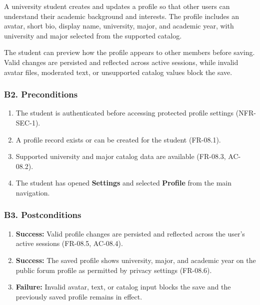 \documentclass[12pt]{article}
\begin{document}
A university student creates and updates a profile so that other users can understand their academic background and interests. The profile includes an avatar, short bio, display name, university, major, and academic year, with university and major selected from the supported catalog.
\par\medskip

The student can preview how the profile appears to other members before saving. Valid changes are persisted and reflected across active sessions, while invalid avatar files, moderated text, or unsupported catalog values block the save.
\par\medskip

\hypertarget{sec:b2-preconditions}{}
\subsubsection*{B2. Preconditions}
\par\medskip

\begin{enumerate}
\item The student is authenticated before accessing protected profile settings (NFR-SEC-1).
\item A profile record exists or can be created for the student (FR-08.1).
\item Supported university and major catalog data are available (FR-08.3, AC-08.2).
\item The student has opened \textbf{Settings} and selected \textbf{Profile} from the main navigation.
\end{enumerate}
\par\medskip

\hypertarget{sec:b3-postconditions}{}
\subsubsection*{B3. Postconditions}
\par\medskip

\begin{enumerate}
\item \textbf{Success:} Valid profile changes are persisted and reflected across the user's active sessions (FR-08.5, AC-08.4).
\item \textbf{Success:} The saved profile shows university, major, and academic year on the public forum profile as permitted by privacy settings (FR-08.6).
\item \textbf{Failure:} Invalid avatar, text, or catalog input blocks the save and the previously saved profile remains in effect.
\end{enumerate}
\par\medskip
\end{document}
